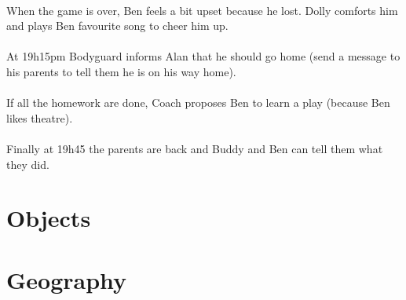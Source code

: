 \paragraph{}
When the game is over, Ben feels a bit upset because he lost.
Dolly comforts him and plays Ben favourite song to cheer him up.
\paragraph{}
At 19h15pm Bodyguard informs Alan that he should go home (send a message to his parents to tell them he is on his way home). 
\paragraph{}
If all the homework are done, Coach proposes Ben to learn a play (because Ben likes theatre). 
\paragraph{}
Finally at 19h45 the parents are back and Buddy and Ben can tell them what they did. 

\section{Objects}
\section{Geography}
